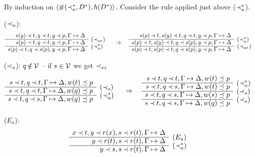 \begin{PROOF}
By induction on $\langle \#(\mathbin{\prec}_a^*,D^*),h(D^*)\rangle$. Consider the rule
applied just above ($\mathbin{\prec}_a^*$).
\begin{LS}
\item ($\mathbin{\prec}_a$):
\[ \begin{array}{rl}
 s(y) \Incl t, q\Incl t, y\Incl p, \GSD \\ \cline{1-1}
 s(p) \Incl t, q\Incl t, y\Incl p, \GSD & \rabove{(\Incl_{ar})} \\
 \cline{1-1}
 s(p) \Incl t, q\Incl s(p), y\Incl p, \GSD & \rabove{(\Incl_a^*)}
 \end{array} \conv
 \begin{array}{rl}
s(p)\Incl t, s(y)\Incl t, q\Incl t, y\Incl p, \GSD \\ \cline{1-1}
s(p)\Incl t, s(y)\Incl t, q\Incl s(p), y\Incl p, \GSD &
\rabove{(\Incl_a^*)} \\ \cline{1-1}
s(p)\Incl t, s(p)\Incl t, q\Incl s(p), y\Incl p, \GSD &
\rabove{(\Incl_{ar})} \end{array} \]
%
\item ($\mathbin{\prec}_s$): $q\not\in\Vars$ -- if $s\in{\cal V}$ we get $\mathbin{\prec}_{sx}$
\[ \begin{array}{rl}
s\Incl t, q\Incl t, \GSD, w(t)\preceq p \\ \cline{1-1}
s\Incl t, q\Incl t, \GSD, w(q)\preceq p & \rabove{(\Incl_s)} \\
\cline{1-1}
s\Incl t, q\Incl s, \GSD, w(q)\preceq p & \rabove{(\Incl_a^*)} \end{array} \conv
 \begin{array}{rl}
s\Incl t, q\Incl t, \GSD, w(t)\preceq p \\ \cline{1-1}
s\Incl t, q\Incl s, \GSD, w(t)\preceq p & \rabove{(\Incl_a^*)} \\
\cline{1-1}
s\Incl t, q\Incl s, \GSD, w(s)\preceq p & \rabove{(\Incl_s)} \\
\cline{1-1} 
s\Incl t, q\Incl s, \GSD, w(q)\preceq p & \rabove{(\Incl_s)} 
\end{array} \]
\item ($E_a$):
\[ \begin{array}{rl}
x\Incl t, y\Incl r(x), s\Incl r(t), \GSD \\ \cline{1-1}
          y\Incl r(t), s\Incl r(t), \GSD  & \rabove{(E_a)} \\ \cline{1-1}
          y\Incl s, s\Incl r(t), \GSD  & \rabove{(\Incl_a^*)} \end{array}
\]
\end{LS}
\end{PROOF}
